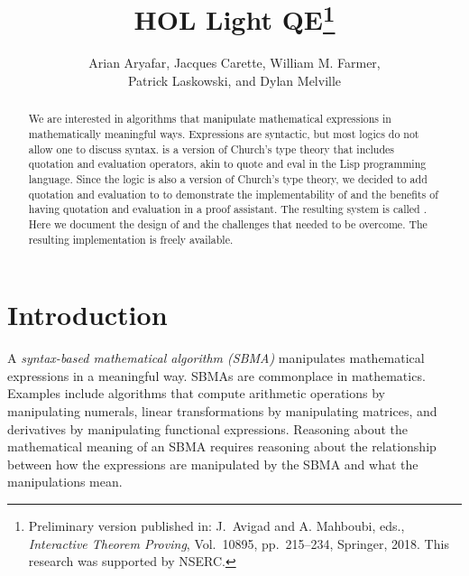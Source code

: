\documentclass[fleqn]{llncs}
\title{{\bf HOL Light QE}\thanks{Preliminary version published in:
    J.~Avigad and A. Mahboubi, eds., \emph{Interactive Theorem
      Proving}, Vol.~10895, pp.~215--234, Springer, 2018.  This
    research was supported by NSERC.}}
\author{Arian Aryafar, Jacques Carette, William M. Farmer,\\ Patrick
  Laskowski, and Dylan Melville}
\institute{%
Computing and Software, McMaster University, Canada\\
\url{http://www.cas.mcmaster.ca/~carette}\\
\url{http://imps.mcmaster.ca/wmfarmer}\\[1.5ex]
17 July 2019
}
\begin{document}
\maketitle

\begin{abstract}
We are interested in algorithms that manipulate mathematical
expressions in mathematically meaningful ways. Expressions are
syntactic, but most logics do not allow one to discuss syntax.
{\churchqe} is a version of Church's type theory that includes
quotation and evaluation operators, akin to quote and eval
in the Lisp programming language.  Since the {\HOL} logic is also a
version of Church's type theory, we decided to add quotation and
evaluation to {\HL} to demonstrate the implementability of {\churchqe}
and the benefits of having quotation and evaluation in a proof
assistant.  The resulting system is called {\HLQE}.  Here we document
the design of {\HLQE} and the challenges that needed to be overcome.
The resulting implementation is freely available.
\end{abstract}

\iffalse 

\textbf{Keywords:} Church's type theory, quotation and evaluation, HOL
Light, proof assistants, symbolic computation, reasoning about syntax,
metareasoning, reflection, biform theories.

\fi

\section{Introduction}\label{sec:introduction}

A \emph{syntax-based mathematical algorithm (SBMA)} manipulates
mathematical expressions in a meaningful way.  SBMAs
are commonplace in mathematics.  Examples include algorithms that
compute arithmetic operations by manipulating numerals, linear
transformations by manipulating matrices, and derivatives by
manipulating functional expressions.  Reasoning about the mathematical
meaning of an SBMA requires reasoning about the relationship between
how the expressions are manipulated by the SBMA and what the
manipulations mean.
\end{document}
